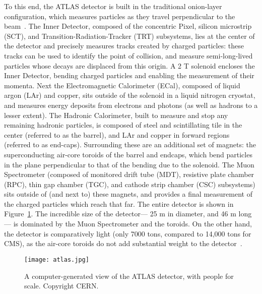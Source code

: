 To this end, the ATLAS detector is built in the traditional onion-layer configuration, which measures particles as they travel perpendicular to the beam~\cite{ATLASPaper}. The Inner Detector, composed of the concentric Pixel, silicon microstrip (SCT), and Transition-Radiation-Tracker (TRT) subsystems, lies at the center of the detector and precisely measures tracks created by charged particles: these tracks can be used to identify the point of collision, and measure semi-long-lived particles whose decays are displaced from this origin. A 2 T solenoid encloses the Inner Detector, bending charged particles and enabling the measurement of their momenta. Next the Electromagnetic Calorimeter (ECal), composed of liquid argon (LAr) and copper, sits outside of the solenoid in a liquid nitrogen cryostat, and measures energy deposits from electrons and photons (as well as hadrons to a lesser extent). The Hadronic Calorimeter, built to measure and stop any remaining hadronic particles, is composed of steel and scintillating tile in the center (referred to as the barrel), and LAr and copper in forward regions (referred to as end-caps). Surrounding these are an additional set of magnets: the superconducting air-core toroids of the barrel and endcaps, which bend particles in the plane perpendicular to that of the bending due to the solenoid. The Muon Spectrometer (composed of monitored drift tube (MDT), resistive plate chamber (RPC), thin gap chamber (TGC), and cathode strip chamber (CSC) subsystems) sits outside of (and next to) these magnets, and provides a final measurement of the charged particles which reach that far. The entire detector is shown in Figure~\ref{fig:detector:atlas}. The incredible size of the detector--- 25 m in diameter, and 46 m long--- is dominated by the Muon Spectrometer and the toroids. On the other hand, the detector is comparatively light (only 7000 tons, compared to 14,000 tons for CMS), as the air-core toroids do not add substantial weight to the detector~\cite{CMSPaper,ATLASPaper}.



\begin{figure}
\centering
\texttt{[image: atlas.jpg]}
\label{fig:detector:atlas}
\caption{A computer-generated view of the ATLAS detector, with people for scale. Copyright CERN.}
\end{figure}




